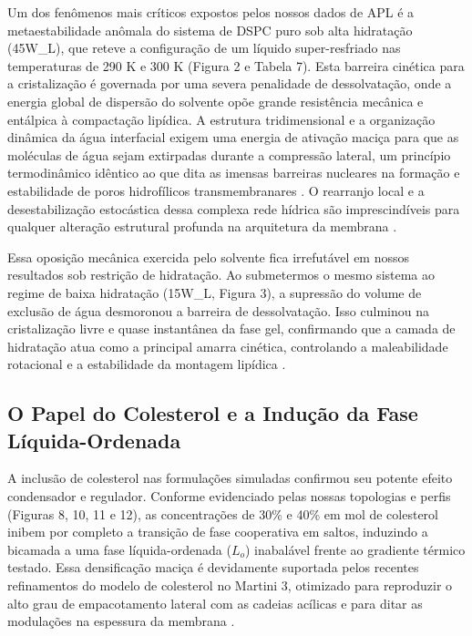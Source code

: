 \documentclass[12pt]{article} %
\begin{document}
Um dos fenômenos mais críticos expostos pelos nossos dados de APL é a metaestabilidade anômala do sistema de DSPC puro sob alta hidratação (45W\_L), que reteve a configuração de um líquido super-resfriado nas temperaturas de 290 K e 300 K (Figura 2 e Tabela 7). Esta barreira cinética para a cristalização é governada por uma severa penalidade de dessolvatação, onde a energia global de dispersão do solvente opõe grande resistência mecânica e entálpica à compactação lipídica. A estrutura tridimensional e a organização dinâmica da água interfacial exigem uma energia de ativação maciça para que as moléculas de água sejam extirpadas durante a compressão lateral, um princípio termodinâmico idêntico ao que dita as imensas barreiras nucleares na formação e estabilidade de poros hidrofílicos transmembranares \cite{hu2015, rivel2025}. O rearranjo local e a desestabilização estocástica dessa complexa rede hídrica são imprescindíveis para qualquer alteração estrutural profunda na arquitetura da membrana \cite{yurtsever2026}.

Essa oposição mecânica exercida pelo solvente fica irrefutável em nossos resultados sob restrição de hidratação. Ao submetermos o mesmo sistema ao regime de baixa hidratação (15W\_L, Figura 3), a supressão do volume de exclusão de água desmoronou a barreira de dessolvatação. Isso culminou na cristalização livre e quase instantânea da fase gel, confirmando que a camada de hidratação atua como a principal amarra cinética, controlando a maleabilidade rotacional e a estabilidade da montagem lipídica \cite{yurtsever2026}.


\subsection{O Papel do Colesterol e a Indução da Fase Líquida-Ordenada}

A inclusão de colesterol nas formulações simuladas confirmou seu potente efeito condensador e regulador. Conforme evidenciado pelas nossas topologias e perfis (Figuras 8, 10, 11 e 12), as concentrações de 30\% e 40\% em mol de colesterol inibem por completo a transição de fase cooperativa em saltos, induzindo a bicamada a uma fase líquida-ordenada ($L_o$) inabalável frente ao gradiente térmico testado. Essa densificação maciça é devidamente suportada pelos recentes refinamentos do modelo de colesterol no Martini 3, otimizado para reproduzir o alto grau de empacotamento lateral com as cadeias acílicas e para ditar as modulações na espessura da membrana \cite{borges2023}.
\end{document}
